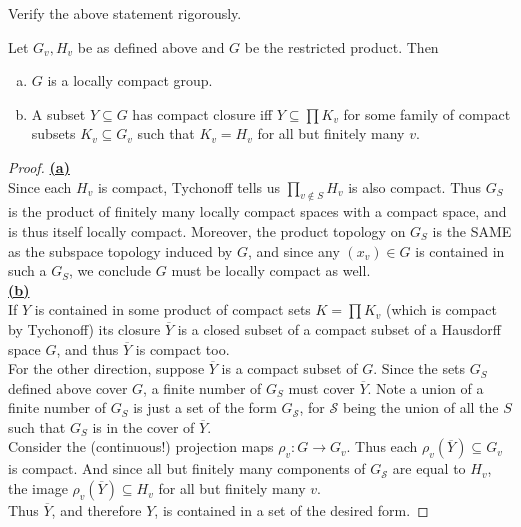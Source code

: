 \documentclass[11pt, x11names]{book}
\newcommand{\fans}{\mathscr{S}}
\renewcommand{\bar}[1]{\overline{#1}}
\begin{document}
\begin{exercise}
\label{restricted product as colimit}
    Verify the above statement rigorously.
\end{exercise}

\begin{prop}
\label{restricted product properties}
Let $G_v, H_v$ be as defined above and $G$ be the restricted product. Then
\begin{enumerate}[(a)]
    \item $G$ is a locally compact group.
    \item A subset $Y \subseteq G$ has compact closure iff $Y \subseteq \prod K_v$ for some family of compact subsets $K_v \subseteq G_v$ such that $K_v = H_v$ for all but finitely many $v$.
\end{enumerate}
\end{prop}
\begin{proof}
\textbf{\underline{(a)}}\\
Since each $H_v$ is compact, Tychonoff tells us $\prod_{v \notin S} H_v$ is also compact. Thus $G_S$ is the product of finitely many locally compact spaces with a compact space, and is thus itself locally compact. Moreover, the product topology on $G_S$ is the SAME as the subspace topology induced by $G$, and since any $(x_v) \in G$ is contained in such a $G_S$, we conclude $G$ must be locally compact as well.\\

\textbf{\underline{(b)}}\\
If $Y$ is contained in some product of compact sets $ K = \prod K_v$ (which is compact by Tychonoff) its closure $\bar{Y}$ is a closed subset of a compact subset of a Hausdorff space $G$, and thus $\bar{Y}$ is compact too.\\
For the other direction, suppose $\bar{Y}$ is a compact subset of $G$. Since the sets $G_S$ defined above cover $G$, a finite number of $G_S$ must cover $\bar{Y}$. Note a union of a finite number of $G_S$ is just a set of the form $G_{\fans}$, for $\fans$ being the union of all the $S$ such that $G_S$ is in the cover of $\bar{Y}$.\\
Consider the (continuous!) projection maps $\rho_v: G \to G_v$. Thus each $\rho_v(\bar{Y}) \subseteq G_v$ is compact. And since all but finitely many components of $G_{\fans}$ are equal to $H_v$, the image $\rho_v(\bar{Y}) \subseteq H_v$ for all but finitely many $v$.\\
Thus $\bar{Y}$, and therefore $Y$, is contained in a set of the desired form.
\end{proof}
\end{document}
